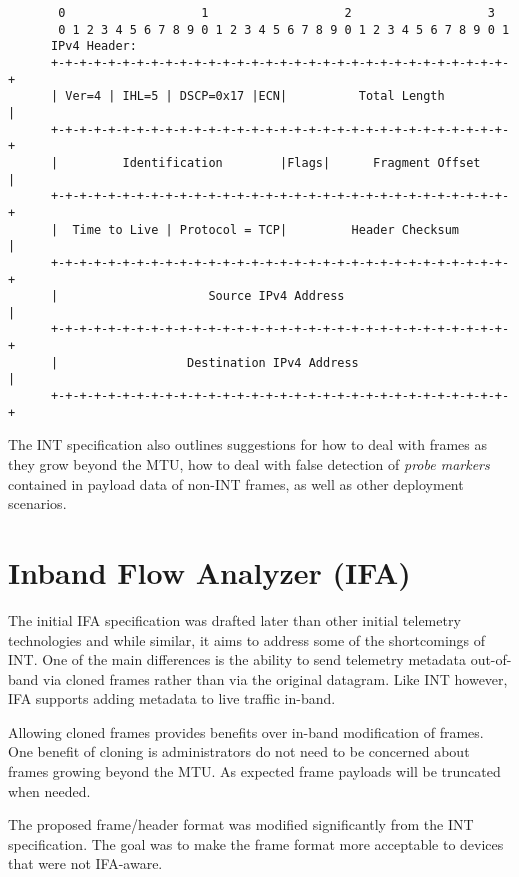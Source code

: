 \documentclass[letterpaper,twocolumn,10pt]{article}
\begin{document}
\tiny
\begin{center}
\begin{verbatim}
       0                   1                   2                   3
       0 1 2 3 4 5 6 7 8 9 0 1 2 3 4 5 6 7 8 9 0 1 2 3 4 5 6 7 8 9 0 1
      IPv4 Header:
      +-+-+-+-+-+-+-+-+-+-+-+-+-+-+-+-+-+-+-+-+-+-+-+-+-+-+-+-+-+-+-+-+
      | Ver=4 | IHL=5 | DSCP=0x17 |ECN|          Total Length         |
      +-+-+-+-+-+-+-+-+-+-+-+-+-+-+-+-+-+-+-+-+-+-+-+-+-+-+-+-+-+-+-+-+
      |         Identification        |Flags|      Fragment Offset    |
      +-+-+-+-+-+-+-+-+-+-+-+-+-+-+-+-+-+-+-+-+-+-+-+-+-+-+-+-+-+-+-+-+
      |  Time to Live | Protocol = TCP|         Header Checksum       |
      +-+-+-+-+-+-+-+-+-+-+-+-+-+-+-+-+-+-+-+-+-+-+-+-+-+-+-+-+-+-+-+-+
      |                     Source IPv4 Address                       |
      +-+-+-+-+-+-+-+-+-+-+-+-+-+-+-+-+-+-+-+-+-+-+-+-+-+-+-+-+-+-+-+-+
      |                  Destination IPv4 Address                     |
      +-+-+-+-+-+-+-+-+-+-+-+-+-+-+-+-+-+-+-+-+-+-+-+-+-+-+-+-+-+-+-+-+
\end{verbatim}
\end{center}
\normalsize

The INT specification also outlines suggestions for how to deal with
frames as they grow beyond the MTU, how to deal with false detection of
\textit{probe markers} contained in payload data of non-INT frames, as well as
other deployment scenarios.

\section{Inband Flow Analyzer (IFA)}

The initial IFA specification was drafted later than other initial
telemetry technologies and while similar, it aims to address some of the
shortcomings of INT.  One of the main differences is the
ability to send telemetry metadata out-of-band via cloned frames rather
than via the original datagram.  Like INT however, IFA supports adding
metadata to live traffic in-band.  

Allowing cloned frames provides benefits over in-band modification of
frames.  One benefit of cloning is administrators do not need to be
concerned about frames growing beyond the MTU.  As expected frame
payloads will be truncated when needed.

The proposed frame/header format was modified significantly from the INT
specification.  The goal was to make the frame format more acceptable to
devices that were not IFA-aware.
\end{document}
